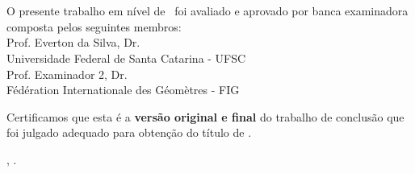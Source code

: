 \documentclass[
	12pt,				%
	oneside,			%
	a4paper,			%
	chapter=TITLE,		%
	section=TITLE,		%
	english,			%
	brazil				%
	]{abntex2}
\begin{document}
\begin{folhadeaprovacao}
	\OnehalfSpacing
	\centering
	\imprimirautor\\%
	\vspace*{10pt}		
	\textbf{\imprimirtitulo}%
	\ifnotempty{\imprimirsubtitulo}{:~\imprimirsubtitulo}\\%
	\vspace*{\baselineskip}
	O presente trabalho em nível de \imprimirnivel~foi avaliado e aprovado por banca examinadora composta pelos seguintes membros:\\
	\vspace*{\baselineskip}
    Prof. Everton da Silva, Dr.\\
  Universidade Federal de Santa Catarina - UFSC\\
  \vspace*{\baselineskip}
    Prof. Examinador 2, Dr.\\
  Fédération Internationale des Géomètres - FIG\\
  \vspace*{\baselineskip}
    
	\vspace*{2\baselineskip}
	\begin{minipage}{\textwidth}
		Certificamos que esta é a \textbf{versão original e final} do trabalho de conclusão que foi julgado adequado para obtenção do título de \imprimirformacao.\\
	\end{minipage}
	\vspace*{\fill}
	\vspace*{\fill}
	\assinatura{\OnehalfSpacing\imprimirorientador \\ \imprimirorientadorRotulo}
	\vspace*{\fill}
	\imprimirlocal, \imprimirano.
\end{folhadeaprovacao}
\end{document}

